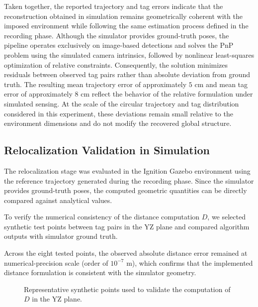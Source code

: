 \documentclass[a4paper,11pt]{article}
\begin{document}
Taken together, the reported trajectory and tag errors indicate that the reconstruction obtained in simulation remains geometrically coherent with the imposed environment while following the same estimation process defined in the recording phase. Although the simulator provides ground-truth poses, the pipeline operates exclusively on image-based detections and solves the PnP problem using the simulated camera intrinsics, followed by nonlinear least-squares optimization of relative constraints. 
Consequently, the solution minimizes residuals between observed tag pairs rather than absolute deviation from ground truth. The resulting mean trajectory error of approximately $5\text{ cm}$ and mean tag error of approximately $8\text{ cm}$ reflect the behavior of the relative formulation under simulated sensing. At the scale of the circular trajectory and tag distribution considered in this experiment, these deviations remain small relative to the environment dimensions and do not modify the recovered global structure.

\subsection{Relocalization Validation in Simulation}
\label{subsec:simulation_results}

The relocalization stage was evaluated in the Ignition Gazebo environment using the reference trajectory generated during the recording phase. Since the simulator provides ground-truth poses, the computed geometric quantities can be directly compared against analytical values.

To verify the numerical consistency of the distance computation $D$, we selected synthetic test points between tag pairs in the YZ plane and compared algorithm outputs with simulator ground truth.

Across the eight tested points, the observed absolute distance error remained at numerical-precision scale (order of $10^{-7}$ m), which confirms that the implemented distance formulation is consistent with the simulator geometry.

\begin{figure}[h]
	\centering
	\begin{minipage}{0.48\linewidth}
		\centering
		
		\caption*{(a) Point 1}
	\end{minipage}
	\hfill
	\begin{minipage}{0.48\linewidth}
		\centering
		
		\caption*{(b) Point 8}
	\end{minipage}
	\caption{Representative synthetic points used to validate the computation of $D$ in the YZ plane.}
	\label{fig:distance_validation}
\end{figure}
\end{document}
